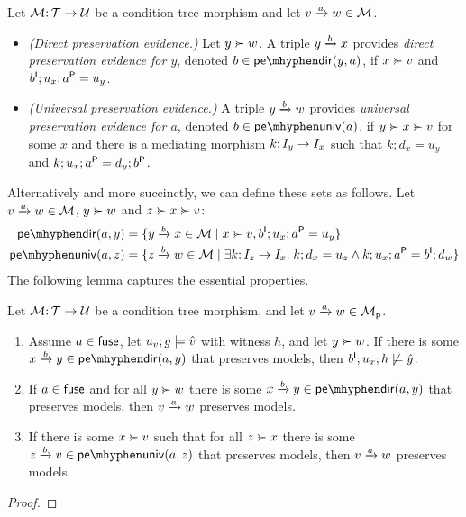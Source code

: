 \begin{definition}\label{def:preservation evidence}
Let $\cM\of \cT\to\cU$ be a condition tree morphism and let $\trip vaw\in\cM$.
\begin{itemize}[topsep=\smallskipamount]
\item \emph{(Direct preservation evidence.)} Let $y\childof w$. A triple $\trip ybx$ provides \emph{direct preservation evidence for $y$}, denoted $b\in\pedir{y,a}$, if $x\childof v$ and $b\I;u_x;a\P=u_y$.
\item \emph{(Universal preservation evidence.)} A triple $\trip ybw$ provides \emph{universal preservation evidence for $a$}, denoted $b\in\peuniv{a}$, if $y\childof x\childof v$ for some $x$ and there is a mediating morphism $k\of I_y\to I_x$ such that $k;d_x=u_y$ and $k;u_x;a\P=d_y;b\P$.
\end{itemize}
\end{definition}
%
Alternatively and more succinctly, we can define these sets as follows. Let $\trip vaw\in\cM$, $y\childof w$ and $z\childof x\childof v$:
%
\begin{align*}
\pedir{a,y} ={} & \gensetof{\trip ybx\in \cM}{x\childof v, b\I;u_x;a\P=u_y} \\
\peuniv{a,z} ={} & \gensetof{\trip zbw\in\cM}{\exists k\of I_z\to I_x\st k;d_x=u_z\wedge k;u_x;a\P=b\I;d_w}
\end{align*}
%
The following lemma captures the essential properties.
%
\begin{lemma}\label{lem:preservation evidence}
Let $\cM\of \cT\to \cU$ be a condition tree morphism, and let $\trip vaw\in \cM_\pgen$.
\begin{enumerate}[topsep=\itemsep]
\item Assume $a\in\fuse$, let $u_v;g\sat \hat v$ with witness $h$, and let $y\childof w$. If there is some $\trip xby\in \pedir{a,y}$ that preserves models, then $b\I;u_x;h\nsat \hat y$.
\item If $a\in \fuse$ and for all $y\childof w$ there is some $\trip xby\in \pedir{a,y}$ that preserves models, then $\trip vaw$ preserves models.
\item If there is some $x\childof v$ such that for all $z\childof x$ there is some $\trip zbv\in\peuniv{a,z}$ that preserves models, then $\trip vaw$ preserves models.
\end{enumerate}
\end{lemma}
%
\begin{proof}
\end{proof}
